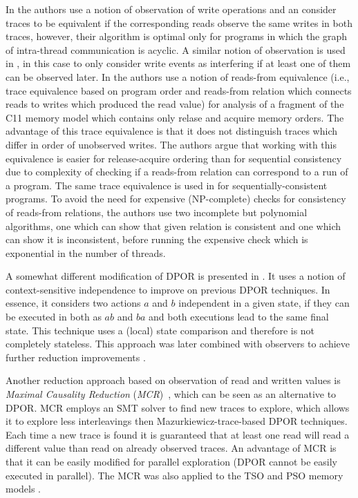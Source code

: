 In  the authors use a notion of observation of write operations and an consider traces to be equivalent if the corresponding reads observe the same writes in both traces, however, their algorithm is optimal only for programs in which the graph of intra-thread communication is acyclic.
A similar notion of observation is used in , in this case to only consider write events as interfering if at least one of them can be observed later.
In  the authors use a notion of reads-from equivalence (i.e., trace equivalence based on program order and reads-from relation which connects reads to writes which produced the read value) for analysis of a fragment of the C11 memory model which contains only relase and acquire memory orders.
The advantage of this trace equivalence is that it does not distinguish traces which differ in order of unobserved writes.
The authors argue that working with this equivalence is easier for release-acquire ordering than for sequential consistency due to complexity of checking if a reads-from relation can correspond to a run of a program.
The same trace equivalence is used in  for sequentially-consistent programs.
To avoid the need for expensive (NP-complete) checks for consistency of reads-from relations, the authors use two incomplete but polynomial algorithms, one which can show that given relation is consistent and one which can show it is inconsistent, before running the expensive check which is exponential in the number of threads.

A somewhat different modification of DPOR is presented in .
It uses a notion of context-sensitive independence to improve on previous DPOR techniques.
In essence, it considers two actions $a$ and $b$ independent in a given state, if they can be executed in both as $ab$ and $ba$ and both executions lead to the same final state.
This technique uses a (local) state comparison and therefore is not completely stateless.
This approach was later combined with observers to achieve further reduction improvements .

Another reduction approach based on observation of read and written values is
\emph{Maximal Causality Reduction} (\emph{MCR})~, which can be
seen as an alternative to DPOR.
MCR employs an SMT solver to find new traces to explore, which allows it to
explore less interleavings then Mazurkiewicz-trace-based DPOR techniques.
Each time a new trace is found it is guaranteed that at least one read will read a different value than read on already observed traces.
An advantage of MCR is that it can be easily modified for parallel
exploration (DPOR cannot be easily executed in parallel).
The MCR was also applied to the TSO and PSO memory models .

